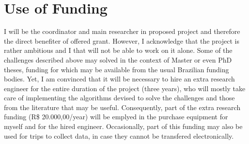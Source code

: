 \section{Use of Funding}

I will be the coordinator and main researcher in proposed project and therefore the direct benefiter of offered grant. However, I acknowledge that the project is rather ambitious and I that will not be able to work on it alone. Some of the challenges described above may solved in the context of Master or even PhD theses, funding for which may be available from the usual Brazilian funding bodies. Yet, I am convinced that it will be necessary to hire an extra research engineer for the entire duration of the project (three years), who will mostly take care of implementing the algorithms devised to solve the challenges and those from the literature that may be useful. Consequently, part of the extra research funding (R\$ 20.000,00/year) will be emplyed in the purchase equipment for myself and for the hired engineer. Occasionally, part of this funding may also be used for trips to collect data, in case they cannot be transfered electronically.
